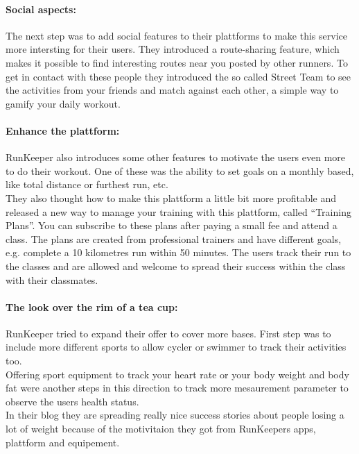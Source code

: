 \documentclass[a4paper,11pt]{article}
\begin{document}
\paragraph{Social aspects:} The next step was to add social features to their plattforms to make this service more intersting for their users. They introduced a route-sharing feature, which makes it possible to find interesting routes near you posted by other runners. To get in contact with these people they introduced the so called Street Team to see the activities from your friends and match against each other, a simple way to gamify your daily workout.

\paragraph{Enhance the plattform:} RunKeeper also introduces some other features to motivate the users even more to do their workout. One of these was the ability to set goals on a monthly based, like total distance or furthest run, etc. \\

They also thought how to make this plattform a little bit more profitable and released a new way to manage your training with this plattform, called ``Training Plans''. You can subscribe to these plans after paying a small fee and attend a class. The plans are created from professional trainers and have different goals, e.g. complete a 10 kilometres run within 50 minutes. The users track their run to the classes and are allowed and welcome to spread their success within the class with their classmates.

\paragraph{The look over the rim of a tea cup:} RunKeeper tried to expand their offer to cover more bases. First step was to include more different sports to allow cycler or swimmer to track their activities too. \\

Offering sport equipment to track your heart rate or your body weight and body fat were another steps in this direction to track more mesaurement parameter to observe the users health status. \\

In their blog they are spreading really nice success stories about people losing a lot of weight because of the motivitaion they got from RunKeepers apps, plattform and equipement. \\
\end{document}
